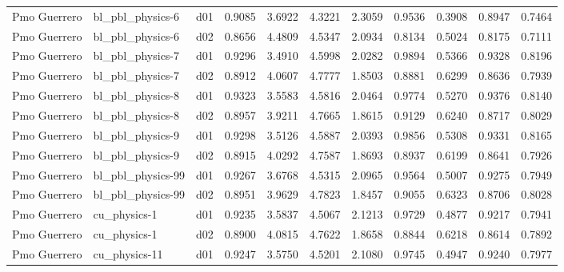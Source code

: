 \begin{longtable}{lllrrrrrrrr}
         Pmo Guerrero  &      bl\_pbl\_physics-6 &     d01 &   0.9085 &   3.6922 &   4.3221 &       2.3059 &        0.9536 &       0.3908 &           0.8947 &  0.7464 \\
         Pmo Guerrero  &      bl\_pbl\_physics-6 &     d02 &   0.8656 &   4.4809 &   4.5347 &       2.0934 &        0.8134 &       0.5024 &           0.8175 &  0.7111 \\
         Pmo Guerrero  &      bl\_pbl\_physics-7 &     d01 &   0.9296 &   3.4910 &   4.5998 &       2.0282 &        0.9894 &       0.5366 &           0.9328 &  0.8196 \\
         Pmo Guerrero  &      bl\_pbl\_physics-7 &     d02 &   0.8912 &   4.0607 &   4.7777 &       1.8503 &        0.8881 &       0.6299 &           0.8636 &  0.7939 \\
         Pmo Guerrero  &      bl\_pbl\_physics-8 &     d01 &   0.9323 &   3.5583 &   4.5816 &       2.0464 &        0.9774 &       0.5270 &           0.9376 &  0.8140 \\
         Pmo Guerrero  &      bl\_pbl\_physics-8 &     d02 &   0.8957 &   3.9211 &   4.7665 &       1.8615 &        0.9129 &       0.6240 &           0.8717 &  0.8029 \\
         Pmo Guerrero  &      bl\_pbl\_physics-9 &     d01 &   0.9298 &   3.5126 &   4.5887 &       2.0393 &        0.9856 &       0.5308 &           0.9331 &  0.8165 \\
         Pmo Guerrero  &      bl\_pbl\_physics-9 &     d02 &   0.8915 &   4.0292 &   4.7587 &       1.8693 &        0.8937 &       0.6199 &           0.8641 &  0.7926 \\
         Pmo Guerrero  &     bl\_pbl\_physics-99 &     d01 &   0.9267 &   3.6768 &   4.5315 &       2.0965 &        0.9564 &       0.5007 &           0.9275 &  0.7949 \\
         Pmo Guerrero  &     bl\_pbl\_physics-99 &     d02 &   0.8951 &   3.9629 &   4.7823 &       1.8457 &        0.9055 &       0.6323 &           0.8706 &  0.8028 \\
         Pmo Guerrero  &          cu\_physics-1 &     d01 &   0.9235 &   3.5837 &   4.5067 &       2.1213 &        0.9729 &       0.4877 &           0.9217 &  0.7941 \\
         Pmo Guerrero  &          cu\_physics-1 &     d02 &   0.8900 &   4.0815 &   4.7622 &       1.8658 &        0.8844 &       0.6218 &           0.8614 &  0.7892 \\
         Pmo Guerrero  &         cu\_physics-11 &     d01 &   0.9247 &   3.5750 &   4.5201 &       2.1080 &        0.9745 &       0.4947 &           0.9240 &  0.7977 \\

\end{longtable}
